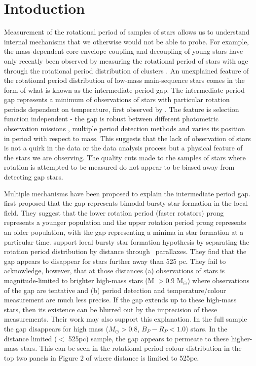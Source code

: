 \section{Intoduction}
\label{sec:intro}
Measurement of the rotational period of samples of stars allows us to understand internal mechanisms that we otherwise would not be able to probe.
For example, the mass-dependent core-envelope coupling and decoupling of young stars have only recently been observed by measuring the rotational period of stars with age through the rotational period distribution of clusters \citep{reinhold_rotation_2015-1}.
An unexplained feature of the rotational period distribution of low-mass main-sequence stars comes in the form of what is known as the intermediate period gap.
The intermediate period gap represents a minimum of observations of stars with particular rotation periods dependent on temperature, first observed by \citet{mcquillan_rotation_2014}.
The feature is selection function independent - the gap is robust between different photometric observation missions \citep{mcquillan_rotation_2014,davenport_rotating_2017,davenport_rotating_2018,lu_bridging_2022}, multiple period detection methods and varies its position in period with respect to mass. 
This suggests that the lack of observation of stars is not a quirk in the data or the data analysis process but a physical feature of the stars we are observing.
The quality cuts made to the samples of stars where rotation is attempted to be measured do not appear to be biased away from detecting gap stars.


Multiple mechanisms have been proposed to explain the intermediate period gap.
\citet{mcquillan_rotation_2014} first proposed that the gap represents bimodal bursty star formation in the local \kepler field.
They suggest that the lower rotation period (faster rotators) prong represents a younger population and the upper rotation period prong represents an older population, with the gap representing a minima in star formation at a particular time.
\citet{davenport_rotating_2018} support local bursty star formation hypothesis by separating the \kepler{} rotation period distribution by distance through \gaia{} \ parallaxes.
They find that the gap appears to disappear for stars further away than 525 pc.
They fail to acknowledge, however, that at those distances (a) observations of stars is magnitude-limited to brighter high-mass stars (M $>$0.9 M$_{\odot}$) where observations of the gap are tentative and (b) period detection and temperature/colour measurement are much less precise.
If the gap extends up to these high-mass stars, then its existence can be blurred out by the imprecision of these measurements.
Their work may also support this explanation.
In the full \citep{mcquillan_rotation_2014} sample the gap disappears for high mass ($M_{\odot} > 0.8$, $B_P - R_P < 1.0$) stars.
In the distance limited ($<$ 525pc) sample, the gap appears to permeate to these higher-mass stars. 
This can be seen in the rotational period-colour distribution in the top two panels in Figure 2 of \citet{davenport_rotating_2018} where distance is limited to 525pc.

